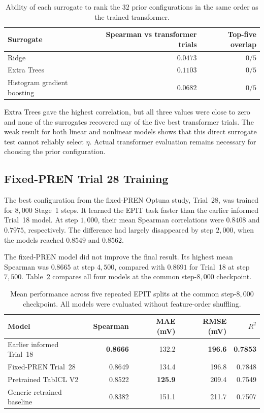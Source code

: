 \documentclass{article}
\begin{document}
\begin{table}[htbp]
\centering
\caption{Ability of each surrogate to rank the $32$ prior configurations in the
same order as the trained transformer.}
\label{tab:surrogate-trial-ranking}
\begin{tabular}{lrr}
\hline
Surrogate & Spearman vs transformer trials & Top-five overlap \\
\hline
Ridge & $0.0473$ & $0/5$ \\
Extra Trees & \textbf{$0.1103$} & $0/5$ \\
Histogram gradient boosting & $0.0682$ & $0/5$ \\
\hline
\end{tabular}
\end{table}

Extra Trees gave the highest correlation, but all three values were close to
zero and none of the surrogates recovered any of the five best transformer
trials. The weak result for both linear and nonlinear models shows that this
direct surrogate test cannot reliably select $\eta$. Actual transformer
evaluation remains necessary for choosing the prior configuration.

\subsection{Fixed-PREN Trial 28 Training}
\label{sec:results-fixed-pren-trial28}

The best configuration from the fixed-PREN Optuna study, Trial~28, was trained
for \(8{,}000\) Stage~1 steps. It learned the EPIT task faster than the earlier
informed Trial~18 model. At step \(1{,}000\), their mean Spearman correlations
were \(0.8408\) and \(0.7975\), respectively. The difference had largely
disappeared by step \(2{,}000\), when the models reached \(0.8549\) and
\(0.8562\).

The fixed-PREN model did not improve the final result. Its highest mean Spearman
was \(0.8665\) at step \(4{,}500\), compared with \(0.8691\) for Trial~18 at
step \(7{,}500\). Table~\ref{tab:fixed-pren-trial28-results} compares all four
models at the common step-\(8{,}000\) checkpoint.

\begin{table}[htbp]
\centering
\caption{Mean performance across five repeated EPIT splits at the common
step-\(8{,}000\) checkpoint. All models were evaluated without feature-order
shuffling.}
\label{tab:fixed-pren-trial28-results}
\begin{tabular}{lrrrr}
\hline
Model & Spearman & MAE (mV) & RMSE (mV) & \(R^2\) \\
\hline
Earlier informed Trial~18
    & \textbf{0.8666} & 132.2 & \textbf{196.6} & \textbf{0.7853} \\
Fixed-PREN Trial~28
    & 0.8649 & 134.4 & 196.8 & 0.7848 \\
Pretrained TabICL V2
    & 0.8522 & \textbf{125.9} & 209.4 & 0.7549 \\
Generic retrained baseline
    & 0.8382 & 151.1 & 211.7 & 0.7507 \\
\hline
\end{tabular}
\end{table}
\end{document}
